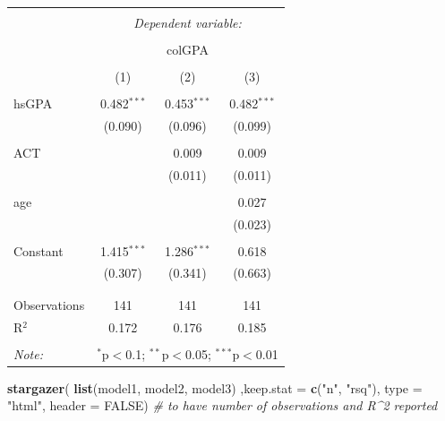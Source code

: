 \documentclass[]{book}
\newenvironment{Shaded}{\begin{snugshade}}{\end{snugshade}}
\newcommand{\CommentTok}[1]{\textcolor[rgb]{0.56,0.35,0.01}{\textit{#1}}}
\newcommand{\DataTypeTok}[1]{\textcolor[rgb]{0.13,0.29,0.53}{#1}}
\newcommand{\KeywordTok}[1]{\textcolor[rgb]{0.13,0.29,0.53}{\textbf{#1}}}
\newcommand{\NormalTok}[1]{#1}
\newcommand{\OtherTok}[1]{\textcolor[rgb]{0.56,0.35,0.01}{#1}}
\newcommand{\StringTok}[1]{\textcolor[rgb]{0.31,0.60,0.02}{#1}}
\begin{document}
\begin{table}[!htbp] \centering 
  \caption{} 
  \label{} 
\begin{tabular}{@{\extracolsep{5pt}}lccc} 
\\[-1.8ex]\hline 
\hline \\[-1.8ex] 
 & \multicolumn{3}{c}{\textit{Dependent variable:}} \\ 
\cline{2-4} 
\\[-1.8ex] & \multicolumn{3}{c}{colGPA} \\ 
\\[-1.8ex] & (1) & (2) & (3)\\ 
\hline \\[-1.8ex] 
 hsGPA & 0.482$^{***}$ & 0.453$^{***}$ & 0.482$^{***}$ \\ 
  & (0.090) & (0.096) & (0.099) \\ 
  & & & \\ 
 ACT &  & 0.009 & 0.009 \\ 
  &  & (0.011) & (0.011) \\ 
  & & & \\ 
 age &  &  & 0.027 \\ 
  &  &  & (0.023) \\ 
  & & & \\ 
 Constant & 1.415$^{***}$ & 1.286$^{***}$ & 0.618 \\ 
  & (0.307) & (0.341) & (0.663) \\ 
  & & & \\ 
\hline \\[-1.8ex] 
Observations & 141 & 141 & 141 \\ 
R$^{2}$ & 0.172 & 0.176 & 0.185 \\ 
\hline 
\hline \\[-1.8ex] 
\textit{Note:}  & \multicolumn{3}{r}{$^{*}$p$<$0.1; $^{**}$p$<$0.05; $^{***}$p$<$0.01} \\ 
\end{tabular} 
\end{table}

\begin{Shaded}
\begin{Highlighting}[]
\KeywordTok{stargazer}\NormalTok{(}
  \KeywordTok{list}\NormalTok{(model1, }
\NormalTok{       model2,}
\NormalTok{       model3)}
\NormalTok{  ,}\DataTypeTok{keep.stat =} \KeywordTok{c}\NormalTok{(}\StringTok{"n"}\NormalTok{, }\StringTok{"rsq"}\NormalTok{), }\DataTypeTok{type =} \StringTok{"html"}\NormalTok{, }\DataTypeTok{header =} \OtherTok{FALSE}\NormalTok{) }\CommentTok{# to have number of observations and R^2 reported}
\end{Highlighting}
\end{Shaded}
\end{document}

